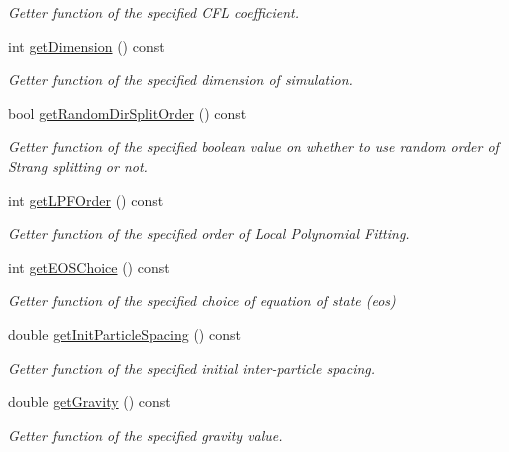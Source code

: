 \begin{DoxyCompactItemize}
\begin{DoxyCompactList}\small\item\em Getter function of the specified C\-F\-L coefficient. \end{DoxyCompactList}\item 
int \hyperlink{classInitializer_ad336449c8ae4f0866aaed2b6ecb8b47b}{get\-Dimension} () const 
\begin{DoxyCompactList}\small\item\em Getter function of the specified dimension of simulation. \end{DoxyCompactList}\item 
bool \hyperlink{classInitializer_a93eb0679fd63b07cf0774875b96d66e9}{get\-Random\-Dir\-Split\-Order} () const 
\begin{DoxyCompactList}\small\item\em Getter function of the specified boolean value on whether to use random order of Strang splitting or not. \end{DoxyCompactList}\item 
int \hyperlink{classInitializer_a03411fd19b6b3141b80652646a2a3796}{get\-L\-P\-F\-Order} () const 
\begin{DoxyCompactList}\small\item\em Getter function of the specified order of Local Polynomial Fitting. \end{DoxyCompactList}\item 
int \hyperlink{classInitializer_a2107696e4b4638f9752ba4a2b2e9c57e}{get\-E\-O\-S\-Choice} () const 
\begin{DoxyCompactList}\small\item\em Getter function of the specified choice of equation of state (eos) \end{DoxyCompactList}\item 
double \hyperlink{classInitializer_a70bb3a249925f55e2e1581bdc960b260}{get\-Init\-Particle\-Spacing} () const 
\begin{DoxyCompactList}\small\item\em Getter function of the specified initial inter-\/particle spacing. \end{DoxyCompactList}\item 
double \hyperlink{classInitializer_a29d827fbcc690011796160e9c372819c}{get\-Gravity} () const 
\begin{DoxyCompactList}\small\item\em Getter function of the specified gravity value. \end{DoxyCompactList}\item 

\end{DoxyCompactItemize}

